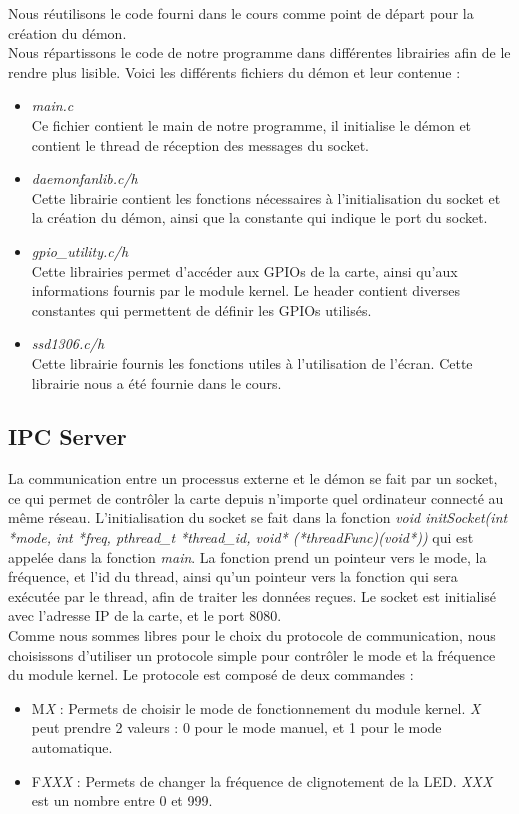 \documentclass[
	a4paper, %
	10pt, %
]{CSUniSchoolLabReport}
\begin{document}
Nous réutilisons le code fourni dans le cours comme point de départ pour la création du démon. \\

Nous répartissons le code de notre programme dans différentes librairies afin de le rendre plus lisible. Voici les différents fichiers du démon et leur contenue : \\
\begin{itemize}
	\item \textit{main.c}\\
	Ce fichier contient le main de notre programme, il initialise le démon et contient le thread de réception des messages du socket.
	\item \textit{daemonfanlib.c/h}\\
	Cette librairie contient les fonctions nécessaires à l'initialisation du socket et la création du démon, ainsi que la constante qui indique le port du socket.
	\item \textit{gpio\_utility.c/h}\\
	Cette librairies permet d'accéder aux GPIOs de la carte, ainsi qu'aux informations fournis par le module kernel. Le header contient diverses constantes qui permettent de définir les GPIOs utilisés.
	\item \textit{ssd1306.c/h}\\
	Cette librairie fournis les fonctions utiles à l'utilisation de l'écran. Cette librairie nous a été fournie dans le cours.

\end{itemize}
\subsection{IPC Server}\label{IPCServer}
La communication entre un processus externe et le démon se fait par un socket, ce qui permet de contrôler la carte depuis n'importe quel ordinateur connecté au même réseau. 
L'initialisation du socket se fait dans la fonction \textit{void initSocket(int *mode, int *freq, pthread\_t *thread\_id, void* (*threadFunc)(void*))} qui est appelée dans la fonction \textit{main}.
La fonction prend un pointeur vers le mode, la fréquence, et l'id du thread, ainsi qu'un pointeur vers la fonction qui sera exécutée par le thread, afin de traiter les données reçues.
Le socket est initialisé avec l'adresse IP de la carte, et le port 8080. \\

\newpage
Comme nous sommes libres pour le choix du protocole de communication, nous choisissons d'utiliser un protocole simple pour contrôler le mode et la fréquence du module kernel.
Le protocole est composé de deux commandes : \\
\begin{itemize}
	\item M\textit{X} : Permets de choisir le mode de fonctionnement du module kernel. \textit{X} peut prendre 2 valeurs : 0 pour le mode manuel, et 1 pour le mode automatique.
	\item F\textit{XXX} : Permets de changer la fréquence de clignotement de la LED. \textit{XXX} est un nombre entre 0 et 999.
\end{itemize}
\end{document}
